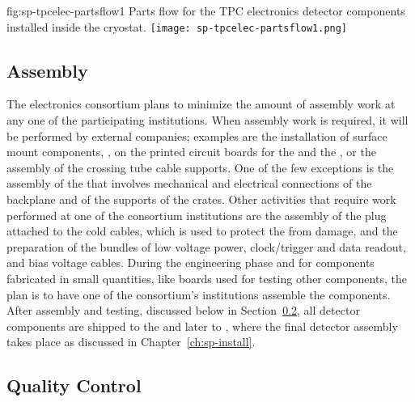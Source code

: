 \begin{dunefigure}
{fig:sp-tpcelec-partsflow1}
{Parts flow for the TPC electronics detector components installed inside the cryostat.}
\texttt{[image: sp-tpcelec-partsflow1.png]}
\end{dunefigure}


\subsection{Assembly}
\label{sec:fdsp-tpcelec-production-assembly}

The  electronics consortium plans to minimize
the amount of assembly work at any one of the participating
institutions. When assembly work is required, it will be performed
by external companies; examples are the installation of surface 
mount components, ,  on the printed 
circuit boards for the  and the , or
the assembly of the crossing tube cable supports. One of the few
exceptions is the assembly of the  that involves
mechanical and electrical connections of the backplane and of
the supports of the crates. Other activities that require 
work performed at one of the consortium institutions are the
assembly of the plug attached to the cold cables, which is used to protect
the  from  damage, and the preparation of
the bundles of low voltage power, clock/trigger and data readout,
and bias voltage cables. During the engineering
phase and for components fabricated in small quantities, 
like boards used for testing other components, the plan is to
have one of the consortium's institutions assemble the components.
After assembly and testing, discussed below in Section~\ref{sec:fdsp-tpcelec-production-qc},
all detector components are shipped to the  and
later to , where the final detector assembly
takes place as discussed in Chapter~\ref{ch:sp-install}.

\subsection{Quality Control}
\label{sec:fdsp-tpcelec-production-qc}

